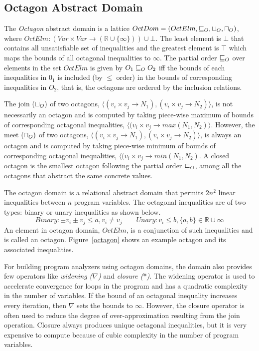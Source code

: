 \subsection{Octagon Abstract Domain}
The {\em Octagon} abstract domain is a lattice 
$OctDom = (OctElm, \sqsubseteq_{O}, \sqcup_{O}, \sqcap_{O})$, where
$OctElm: (Var \times Var \rightarrow (\mathbb{R} \cup \{\infty\})) \cup \bot$. 
The least element is $\bot$ that contains all unsatisfiable 
set of inequalities and the greatest element is $\top$ which 
maps the bounds of all octagonal inequalities to $\infty$. 
The partial order $\sqsubseteq_{O}$ over elements in the set $OctElm$ is 
given by $O_1 \sqsubseteq_{O} O_2$ iff the bounds of each inequalities in $0_1$ 
is included (by $\leq$ order) in the bounds of corresponding inequalities 
in $O_2$, that is, the octagons are ordered by the inclusion relations.

The join $(\sqcup_{O})$ of two octagons, $\langle (v_i \times v_j \rightarrow N_1),
(v_i \times v_j \rightarrow N_2) \rangle$, is not necessarily an octagon 
and is computed by taking piece-wise maximum of bounds of corresponding 
octagonal inequalities, $\langle (v_i \times v_j \rightarrow max(N_1, N_2) \rangle$.
However, the meet $(\sqcap_{O})$ of two octagons, $\langle (v_i \times v_j \rightarrow N_1),
(v_i \times v_j \rightarrow N_2) \rangle$, is always an octagon and is 
computed by taking piece-wise minimum of bounds of corresponding 
octagonal inequalities, $\langle (v_i \times v_j \rightarrow min(N_1, N_2)$.  A closed 
octagon is the smallest octagon following the partial order $\sqsubseteq_{O}$, among all 
the octagons that abstract the same concrete values.

The octagon domain is a relational abstract domain that permits $2n^2$ 
linear inequalities between $n$ program variables.  The octagonal 
inequalities are of two types: binary or unary inequalities as shown below.
\[Binary: \pm v_i \pm v_j \leq a, v_i \neq v_j \qquad Unary: v_i \leq b, \{a, b\} \in \mathbb{R} \cup \infty \]  
An element in octagon domain, $OctElm$, is a conjunction of such 
inequalities and is called an octagon.  Figure~\ref{octagon} shows an 
example octagon and its associated inequalities.   

For building program analyzers using octagon domains, the domain also 
provides few operators like {\em widening ($\nabla$)} and {\em closure ($*$)}.  
The widening operator is used to accelerate convergence for loops in the program
and has a quadratic complexity in the number of variables.  If the bound of an 
octagonal inequality increases every iteration, then $\nabla$ sets the bounds 
to $\infty$.  However, the closure operator is often used to reduce the degree 
of over-approximation resulting from the join operation. Closure always produces 
unique octagonal inequalities, but it is very expensive to compute because of 
cubic complexity in the number of program variables.  
 
